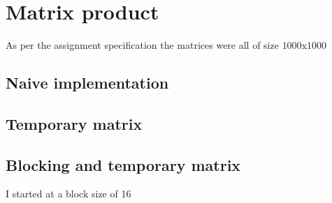 \documentclass[10pt,a4paper,oneside]{article}
\begin{document}
    \section{Matrix product}
    As per the assignment specification the matrices were all of size $1000$x$1000$
    \subsection{Naive implementation}
    \subsection{Temporary matrix}
    \subsection{Blocking and temporary matrix}
    I started at a block size of 16
\end{document}
